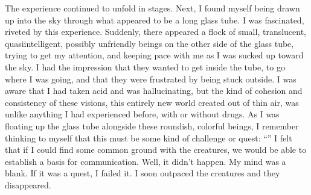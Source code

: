 \documentclass[a5paper,10pt,english]{book}
\begin{document}
\sphinxAtStartPar
The experience continued to unfold in stages. Next, I found myself being
drawn up into the sky through what appeared to be a long glass tube. I
was fascinated, riveted by this experience. Suddenly, there appeared a
flock of small, translucent, quasi\sphinxhyphen{}intelligent, possibly unfriendly
beings on the other side of the glass tube, trying to get my attention,
and keeping pace with me as I was sucked up toward the sky. I had the
impression that they wanted to get inside the tube, to go where I was
going, and that they were frustrated by being stuck outside. I was aware
that I had taken acid and was hallucinating, but the kind of cohesion
and consistency of these visions, this entirely new world created out of
thin air, was unlike anything I had experienced before, with or without
drugs. As I was floating up the glass tube alongside these roundish,
colorful beings, I remember thinking to myself that this must be some
kind of challenge or quest: “” I felt that if I could find some common
ground with the creatures, we would be able to establish a basis for
communication. Well, it didn’t happen. My mind was a blank. If it was a
quest, I failed it. I soon outpaced the creatures and they disappeared.
\end{document}
